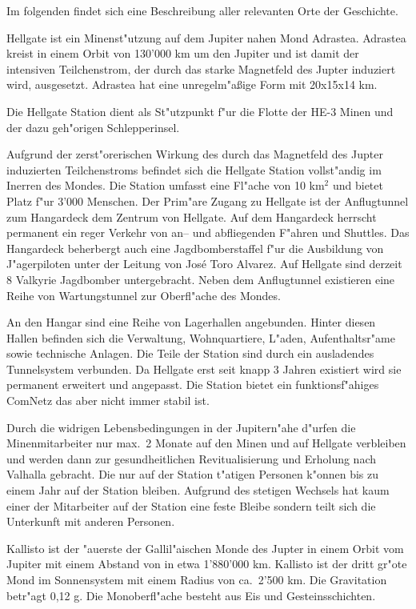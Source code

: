 
Im folgenden findet sich eine Beschreibung aller relevanten Orte der Geschichte.


Hellgate ist ein Minenst"utzung auf dem Jupiter nahen Mond Adrastea. Adrastea kreist in einem Orbit von 130'000 km um den Jupiter und
ist damit der intensiven Teilchenstrom, der durch das starke Magnetfeld des Jupter induziert wird, ausgesetzt. Adrastea hat eine unregelm"aßige Form mit 20x15x14 km.

Die Hellgate Station dient als St"utzpunkt f"ur die Flotte der HE-3 Minen und der dazu geh"origen Schlepperinsel. 

Aufgrund der zerst"orerischen Wirkung des durch das Magnetfeld des Jupter induzierten Teilchenstroms befindet sich die Hellgate Station vollst"andig im Inerren des Mondes. Die Station umfasst eine Fl"ache von 10 km$^{2}$ und bietet Platz f"ur 3'000 Menschen. Der Prim"are Zugang zu Hellgate ist der Anflugtunnel zum Hangardeck dem Zentrum von Hellgate. Auf dem Hangardeck herrscht permanent ein reger Verkehr von an-- und abfliegenden F"ahren und Shuttles. Das Hangardeck beherbergt auch eine Jagdbomberstaffel f"ur die Ausbildung von J"agerpiloten unter der Leitung von Jos\'{e} \frqq{}Toro\flqq{} Alvarez. Auf Hellgate sind derzeit 8 Valkyrie Jagdbomber untergebracht. Neben dem Anflugtunnel existieren eine Reihe von Wartungstunnel zur Oberfl"ache des Mondes.

An den Hangar sind eine Reihe von Lagerhallen angebunden. Hinter diesen Hallen befinden sich die Verwaltung, Wohnquartiere, L"aden, Aufenthaltsr"ame sowie technische Anlagen. Die Teile der Station sind durch ein ausladendes Tunnelsystem verbunden. Da Hellgate erst seit knapp 3 Jahren existiert wird sie permanent erweitert und angepasst. Die Station bietet ein funktionsf"ahiges ComNetz das aber nicht immer stabil ist.

Durch die widrigen Lebensbedingungen in der Jupitern"ahe d"urfen die Minenmitarbeiter nur max.~2 Monate auf den Minen und auf Hellgate verbleiben und werden dann zur gesundheitlichen Revitualisierung und Erholung nach Valhalla gebracht. Die nur auf der Station t"atigen Personen k"onnen bis zu einem Jahr auf der Station bleiben. Aufgrund des stetigen Wechsels hat kaum einer der Mitarbeiter auf der Station eine feste Bleibe sondern teilt sich die Unterkunft mit anderen Personen.


Kallisto ist der "au\3erste der Gallil"aischen Monde des Jupter in einem Orbit vom Jupiter mit einem Abstand von in
etwa 1'880'000 km. Kallisto ist der dritt gr"o\3te Mond im Sonnensystem mit einem Radius von ca.~2'500 km. Die
Gravitation betr"agt 0,12 g. Die Monoberfl"ache besteht aus Eis und Gesteinsschichten.

